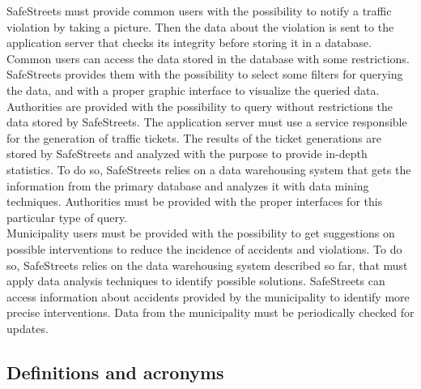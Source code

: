 \documentclass[./main.tex]{subfiles}
\begin{document}
SafeStreets must provide common users with the possibility to notify a traffic
violation by taking a picture. Then the data about the violation is sent to the
application server that checks its integrity before storing it in a database.
Common users can access the data stored in the database with some restrictions.
SafeStreets provides them with the possibility to select some filters for
querying the data, and with a proper graphic interface to visualize the queried
data.\medskip\\
Authorities are provided with the possibility to query without restrictions the
data stored by SafeStreets. The application server must use a service
responsible for the generation of traffic tickets. The results of the ticket
generations are stored by SafeStreets and analyzed with the purpose to provide
in-depth statistics. To do so, SafeStreets relies on a data warehousing system
that gets the information from the primary database and analyzes it with data
mining techniques. Authorities must be provided with the proper interfaces for
this particular type of query.\medskip\\
Municipality users must be provided with the possibility to get suggestions on
possible interventions to reduce the incidence of accidents and violations. To
do so, SafeStreets relies on the data warehousing system described so far, that
must apply data analysis techniques to identify possible solutions. SafeStreets
can access information about accidents provided by the municipality to identify
more precise interventions. Data from the municipality must be periodically
checked for updates.

\subsection{Definitions and acronyms}
\end{document}
